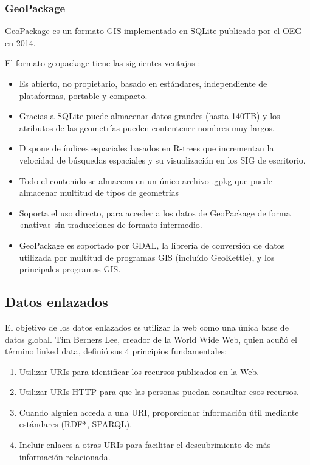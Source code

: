 \subsubsection{GeoPackage}
GeoPackage es un formato GIS implementado en SQLite publicado por el OEG en 2014. \cite{geopackage-spec}
    
El formato geopackage tiene las siguientes ventajas \cite{shapefile-no}:
\begin{itemize}

    \item Es abierto, no propietario, basado en estándares, independiente de plataformas,
        portable y compacto.

    \item Gracias a SQLite puede almacenar datos grandes (hasta 140TB)\cite{sqlite-limits} y los atributos de
        las geometrías pueden contentener nombres muy largos.

    \item Dispone de índices espaciales basados en R-trees \cite{rtree} que incrementan la velocidad de búsquedas
        espaciales y su visualización en los SIG de escritorio.
       
    \item Todo el contenido se almacena en un único archivo .gpkg que puede almacenar multitud de tipos de
        geometrías

    \item Soporta el uso directo, para acceder a los datos de GeoPackage de forma «nativa» sin traducciones de
        formato intermedio.

    \item GeoPackage es soportado por GDAL\cite{gdal}, la librería de conversión de datos utilizada por multitud
        de programas GIS (incluído GeoKettle), y los principales programas GIS.
\end{itemize}


\subsection{Datos enlazados}
El objetivo de los datos enlazados es utilizar la web como una única base de datos global. Tim Berners Lee,
creador de la World Wide Web, quien acuñó el término linked data\cite{berners-lee}, definió sus 4 principios
fundamentales:

\begin{enumerate}
    \item Utilizar URIs para identificar los recursos publicados en la Web.
    \item Utilizar URIs HTTP para que las personas puedan consultar esos recursos.
    \item Cuando alguien acceda a una URI, proporcionar información útil mediante estándares (RDF*, SPARQL).
    \item Incluir enlaces a otras URIs para facilitar el descubrimiento de más información relacionada.
\end{enumerate}

